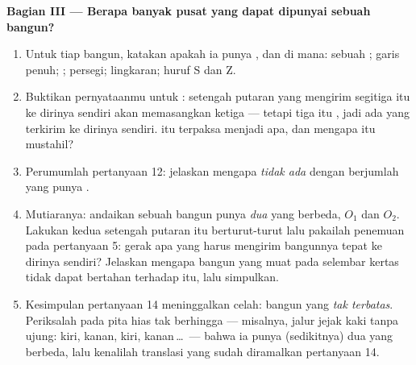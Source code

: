 \begin{problem}
\medskip
\noindent\textbf{Bagian III --- Berapa banyak pusat yang dapat dipunyai
sebuah bangun?}
\begin{enumerate}[resume]
  \item Untuk tiap bangun, katakan apakah ia punya ,
        dan di mana: sebuah ; garis penuh; ; persegi; lingkaran; huruf S dan Z.
  \item Buktikan pernyataanmu untuk : setengah
        putaran yang mengirim segitiga itu ke dirinya sendiri akan
        memasangkan ketiga  --- tetapi tiga itu ,
        jadi ada  yang terkirim ke dirinya sendiri.  itu terpaksa menjadi apa, dan mengapa itu mustahil?
  \item Perumumlah pertanyaan 12: jelaskan mengapa \emph{tidak ada}
         dengan  berjumlah  yang punya
        .
  \item Mutiaranya: andaikan sebuah bangun punya \emph{dua}  yang berbeda, $O_1$ dan $O_2$. Lakukan kedua setengah
        putaran itu berturut-turut lalu pakailah penemuan pada
        pertanyaan 5: gerak apa yang harus mengirim bangunnya tepat
        ke dirinya sendiri? Jelaskan mengapa bangun yang muat pada
        selembar kertas tidak dapat bertahan terhadap itu, lalu
        simpulkan.
  \item Kesimpulan pertanyaan 14 meninggalkan celah: bangun yang
        \emph{tak terbatas}. Periksalah pada pita hias tak berhingga
        --- misalnya, jalur jejak kaki tanpa ujung: kiri, kanan,
        kiri, kanan\,\dots\ --- bahwa ia punya (sedikitnya)
        dua  yang berbeda, lalu kenalilah translasi
        yang sudah diramalkan pertanyaan 14.

\end{enumerate}
\end{problem}
